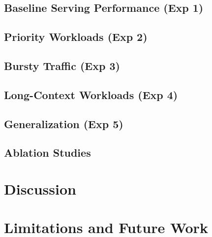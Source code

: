 \documentclass{article}
\begin{document}

\subsection{Baseline Serving Performance (Exp 1)}

\subsection{Priority Workloads (Exp 2)}

\subsection{Bursty Traffic (Exp 3)}

\subsection{Long-Context Workloads (Exp 4)}

\subsection{Generalization (Exp 5)}

\subsection{Ablation Studies}

\section{Discussion}


\section{Limitations and Future Work}
\end{document}
